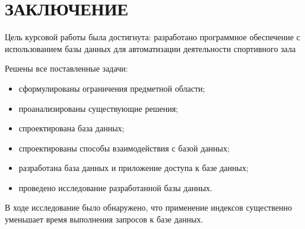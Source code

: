 \chapter*{ЗАКЛЮЧЕНИЕ}

Цель курсовой работы была достигнута: разработано программное обеспечение с использованием
базы данных для автоматизации деятельности спортивного зала

Решены все поставленные задачи:

\begin{itemize}[label=—]
	\item сформулированы ограничения предметной области;
	\item проанализированы существующие решения;
	\item спроектирована база данных;
	\item спроектированы способы взаимодействия с базой данных;
	\item разработана база данных и приложение доступа к базе данных;
	\item проведено исследование разработанной базы данных.
\end{itemize}

В ходе исследование было обнаружено, что применение индексов существенно уменьшает время выполнения запросов
к базе данных.
